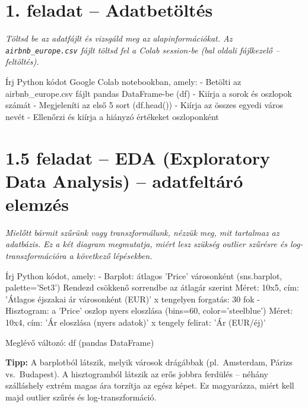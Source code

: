 \documentclass[11pt,a4paper]{article}
\newcommand{\tip}[1]{%
  \vspace{3pt}%
  \begin{tcolorbox}[tipstyle]%
  \textbf{\textcolor{tipborder}{Tipp:}} #1%
  \end{tcolorbox}\vspace{2pt}}
\begin{document}
\section{1. feladat -- Adatbetöltés}

\noindent\textit{Töltsd be az adatfájlt és vizsgáld meg az alapinformációkat.
Az \texttt{airbnb\_europe.csv} fájlt töltsd fel a Colab session-be
(bal oldali fájlkezelő -- feltöltés).}

\begin{prompt}
Írj Python kódot Google Colab notebookban, amely:
- Betölti az airbnb_europe.csv fájlt pandas DataFrame-be (df)
- Kiírja a sorok és oszlopok számát
- Megjeleníti az első 5 sort (df.head())
- Kiírja az összes egyedi város nevét
- Ellenőrzi és kiírja a hiányzó értékeket oszloponként
\end{prompt}

\section{1.5 feladat -- EDA (Exploratory Data Analysis) – adatfeltáró elemzés}

\noindent\textit{Mielőtt bármit szűrünk vagy transzformálunk, nézzük meg, mit tartalmaz az adatbázis.
Ez a két diagram megmutatja, miért lesz szükség outlier szűrésre és log-transzformációra a következő lépésekben.}

\begin{prompt}
Írj Python kódot, amely:
- Barplot: átlagos 'Price' városonként (sns.barplot, palette='Set3')
  Rendezd csökkenő sorrendbe az átlagár szerint
  Méret: 10x5, cím: 'Átlagos éjszakai ár városonként (EUR)'
  x tengelyen forgatás: 30 fok
- Hisztogram: a 'Price' oszlop nyers eloszlása (bins=60, color='steelblue')
  Méret: 10x4, cím: 'Ár eloszlása (nyers adatok)'
  x tengely felirat: 'Ár (EUR/éj)'

Meglévő változó: df (pandas DataFrame)
\end{prompt}

\tip{A barplotból látszik, melyik városok drágábbak (pl.\ Amsterdam, Párizs vs.\ Budapest).
A hisztogramból látszik az erős jobbra ferdülés -- néhány szálláshely extrém magas ára torzítja az egész képet.
Ez magyarázza, miért kell majd outlier szűrés és log-transzformáció.}
\end{document}
